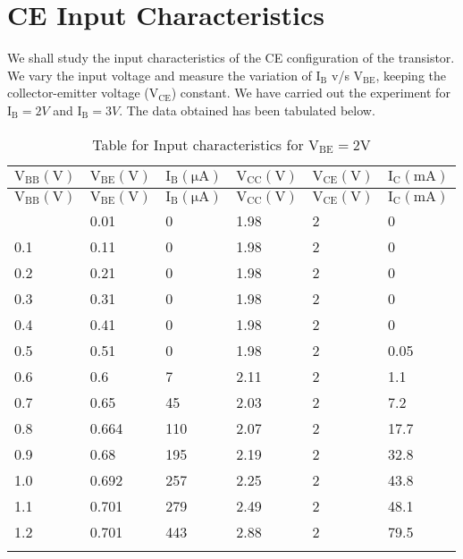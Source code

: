\documentclass[12pt]{article}
\begin{document}
\section{CE Input Characteristics}
We shall study the input characteristics of the CE configuration of the transistor. We vary the input voltage and measure the variation of  $\mathrm{I_B}$ v/s $\mathrm{V_{BE}}$, keeping the collector-emitter voltage ($\mathrm{V_{CE}}$) constant. We have carried out the experiment for $\mathrm{I_B}=2 V$ and $\mathrm{I_B}=3 V$. The data obtained has been tabulated below.
\begin{longtable}{|l|l|l|l|l|l|}
	\hline
    $\mathrm{V_{BB}(V)}$ & $\mathrm{V_{BE}(V)}$ & $\mathrm{I_{B}(\mu A)}$  & $\mathrm{V_{CC}(V)}$  & $\mathrm{V_{CE}(V)}$ & $\mathrm{I_{C}(m A)}$  \\ \hline
	\endfirsthead
	\hline
   $\mathrm{V_{BB}(V)}$ & $\mathrm{V_{BE}(V)}$ & $\mathrm{I_{B}(\mu A)}$  & $\mathrm{V_{CC}(V)}$  & $\mathrm{V_{CE}(V)}$ & $\mathrm{I_{C}(mA)}$  \\ \hline
	\endhead
	\hline
	\endfoot
	
	\endlastfoot
    0.01 & 0.01  & 0   & 1.98  & 2  & 0   \\ \hline
    0.1  & 0.11  & 0   & 1.98  & 2  & 0   \\ \hline
    0.2  & 0.21  & 0   & 1.98  & 2  & 0   \\ \hline
    0.3  & 0.31  & 0   & 1.98  & 2  & 0   \\ \hline
    0.4  & 0.41  & 0   & 1.98  & 2  & 0   \\ \hline
    0.5  & 0.51  & 0   & 1.98  & 2  & 0.05  \\ \hline
    0.6  & 0.6   & 7   & 2.11  & 2  & 1.1  \\ \hline
    0.7  & 0.65  & 45  & 2.03  & 2  & 7.2  \\ \hline
    0.8  & 0.664 & 110 & 2.07  & 2  & 17.7  \\ \hline
    0.9  & 0.68  & 195 & 2.19  & 2  & 32.8  \\ \hline
    1.0  & 0.692 & 257 & 2.25  & 2  & 43.8  \\ \hline
    1.1  & 0.701 & 279 & 2.49  & 2  & 48.1  \\ \hline
    1.2  & 0.701   & 443 & 2.88  & 2  & 79.5  \\ \hline
\caption{Table for Input characteristics for $\mathrm{V_{BE}=2V}$}
\label{tab:part01_01}
\end{longtable}
\end{document}
